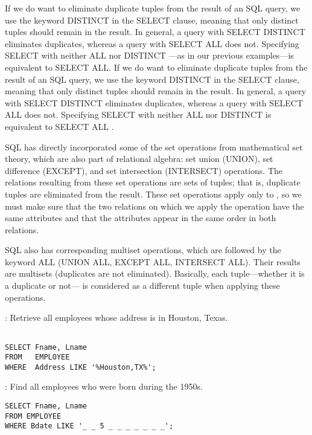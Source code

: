     \par If we do want to eliminate duplicate tuples from the result of an SQL query, we use the keyword DISTINCT in the SELECT clause, meaning that only distinct tuples should remain in the result. In general, a query with SELECT DISTINCT eliminates duplicates, whereas a query with SELECT ALL does not. Specifying SELECT with neither ALL nor DISTINCT —as in our previous examples—is equivalent to SELECT ALL. If we do want to eliminate duplicate tuples from the result of an SQL query, we use the keyword DISTINCT in the SELECT clause, meaning that only distinct tuples should remain in the result. In general, a query with SELECT DISTINCT eliminates duplicates, whereas a query with SELECT ALL does not. Specifying SELECT with neither ALL nor DISTINCT is
equivalent to SELECT ALL .
    \par SQL has directly incorporated some of the set operations from mathematical set
theory, which are also part of relational algebra: set union (UNION), set difference (EXCEPT), and set intersection (INTERSECT) operations. The relations resulting from these set operations are sets of tuples; that is, duplicate tuples are eliminated from the result. These set operations apply only to , so we must make sure that the two relations on which we apply the operation have the same attributes and that the attributes appear in the same order in both relations.
  \par SQL also has corresponding multiset operations, which are followed by the keyword ALL (UNION ALL, EXCEPT ALL, INTERSECT ALL). Their results are multisets (duplicates are not eliminated). Basically, each tuple—whether it is a duplicate or not— is considered as a different tuple when applying these operations.

    \par {}: Retrieve all employees whose address is in Houston, Texas.
      \begin{verbatim}

SELECT Fname, Lname
FROM   EMPLOYEE
WHERE  Address LIKE '%Houston,TX%';
      \end{verbatim}
    \par {}: Find all employees who were born during the 1950s.
      \begin{verbatim}
SELECT Fname, Lname
FROM EMPLOYEE
WHERE Bdate LIKE '_ _ 5 _ _ _ _ _ _ _';
      \end{verbatim}

